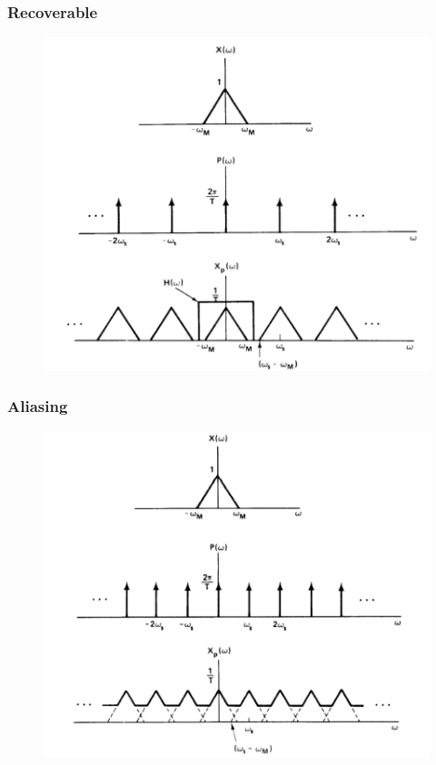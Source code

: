 \documentclass{beamer}
\begin{document}
\begin{frame}
\frametitle{Recoverable}
\begin{figure}
\includegraphics[width=0.7\linewidth]{sample2}
\end{figure}
\end{frame}

\begin{frame}
\frametitle{Aliasing}
\begin{figure}
\includegraphics[width=0.7\linewidth]{sample3}
\end{figure}
\end{frame}
\end{document}
